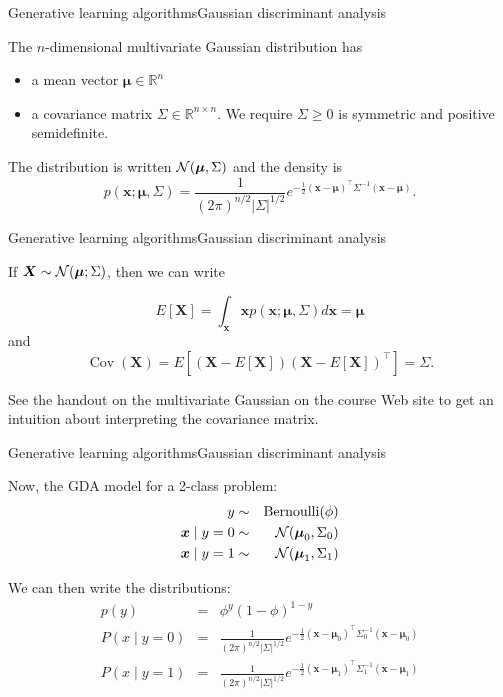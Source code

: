 \documentclass{beamer}
\renewcommand{\vec}[1]{\boldsymbol{#1}}
\def\Rset{\mathbb{R}}
\DeclareMathOperator*{\cov}{Cov}
\begin{document}
\begin{frame}{Generative learning algorithms}{Gaussian discriminant analysis}

  The $n$-dimensional multivariate Gaussian distribution has
  \begin{itemize}
  \item a \alert{mean vector} $\vec{\mu} \in \Rset^n$
  \item a \alert{covariance matrix} $\Sigma \in \Rset^{n\times
    n}$. We require $\Sigma \ge 0$ is symmetric and positive
    semidefinite.
  \end{itemize}

  \medskip

  The distribution is written ${\cal N}(\vec{\mu},\Sigma)$ and the
  density is
  \[ p(\vec{x} ; \vec{\mu}, \Sigma) = \frac{1}{(2\pi)^{n/2}|\Sigma|^{1/2}}
    e^{-\frac{1}{2}(\vec{x}-\vec{\mu})^\top \Sigma^{-1}(\vec{x}-\vec{\mu})} . \]
  
\end{frame}


\begin{frame}{Generative learning algorithms}{Gaussian discriminant analysis}

  If $\vec{X} \sim {\cal N}(\vec{\mu} ; \Sigma)$, then we can write
  
  \[ E[\vec{X}] = \int_{\vec{x}} \vec{x} p(\vec{x}; \vec{\mu},\Sigma)
  d\vec{x} = \vec{\mu} \]
  and
  \[ \cov(\vec{X}) = E[(\vec{X}-E[\vec{X}])(\vec{X}-E[\vec{X}])^\top] = \Sigma . \]

  \medskip

  See the handout on the multivariate Gaussian on the course Web site
  to get an intuition about interpreting the covariance matrix.
  
\end{frame}


\begin{frame}{Generative learning algorithms}{Gaussian discriminant analysis}

  Now, the GDA model for a 2-class problem:
  \begin{eqnarray}
    y & \sim & \textrm{Bernoulli}(\phi) \nonumber \\
    \vec{x} \mid y = 0 & \sim & {\cal N}(\vec{\mu}_0,\Sigma_0) \nonumber \\
    \vec{x} \mid y = 1 & \sim & {\cal N}(\vec{\mu}_1,\Sigma_1) \nonumber
  \end{eqnarray}

  \medskip

  We can then write the distributions:
  \begin{eqnarray}
    p(y) & = & \phi^y(1-\phi)^{1-y} \nonumber \\
    P(x \mid y=0) & = & \frac{1}{(2\pi)^{n/2}|\Sigma|^{1/2}} e^{-\frac{1}{2}(\vec{x}-\vec{\mu}_0)^\top \Sigma_0^{-1} (\vec{x}-\vec{\mu}_0)} \nonumber \\
      P(x \mid y=1) & = & \frac{1}{(2\pi)^{n/2}|\Sigma|^{1/2}} e^{-\frac{1}{2}(\vec{x}-\vec{\mu}_1)^\top \Sigma_1^{-1} (\vec{x}-\vec{\mu}_1)} \nonumber
  \end{eqnarray}

\end{frame}
\end{document}
